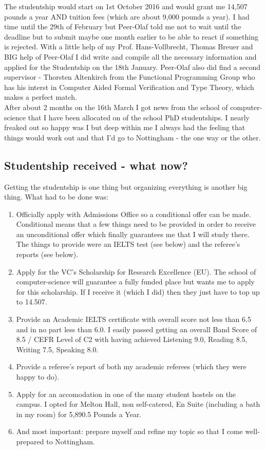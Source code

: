 The studentship would start on 1st October 2016 and would grant me 14,507 pounds a year AND tuition fees (which are about 9,000 pounds a year). I had time until the 29th of February but Peer-Olaf told me not to wait until the deadline but to submit maybe one month earlier to be able to react if something is rejected. 
With a little help of my Prof. Hans-Vollbrecht, Thomas Breuer and BIG help of Peer-Olaf I did write and compile all the necessary information and applied for the Studentship on the 18th January. Peer-Olaf also did find a second supervisor - Thorsten Altenkirch from the Functional Programming Group who has his interst in Computer Aided Formal Verification and Type Theory, which makes a perfect match. \\

After about 2 months on the 16th March I got news from the school of computer-science that I have been allocated on of the school PhD studentships. I nearly freaked out so happy was I but deep within me I always had the feeling that things would work out and that I'd go to Nottingham - the one way or the other. 

\subsection*{Studentship received - what now?}
Getting the studentship is one thing but organizing everything is another big thing. What had to be done was:

\begin{enumerate}
\item Officially apply with Admissions Office so a conditional offer can be made. Conditional means that a few things need to be provided in order to receive an unconditional offer which finally guarantees me that I will study there. The things to provide were an IELTS test (see below) and the referee's reports (see below).
\item Apply for the VC's Scholarship for Research Excellence (EU). The school of computer-science will guarantee a fully funded place but wants me to apply for this scholarship. If I receive it (which I did) then they just have to top up to 14.507.
\item Provide an Academic IELTS certificate with overall score not less than 6.5 and in no part less than 6.0. I easily passed getting an overall Band Score of 8.5 / CEFR Level of C2 with having achieved Listening 9.0, Reading 8.5, Writing 7.5, Speaking 8.0.
\item Provide a referee's report of both my academic referees (which they were happy to do).
\item Apply for an accomodation in one of the many student hostels on the campus. I opted for Melton Hall, non self-catered, En Suite (including a bath in my room) for 5,890.5 Pounds a Year. 
\item And most important: prepare myself and refine my topic so that I come well-prepared to Nottingham.
\end{enumerate}

